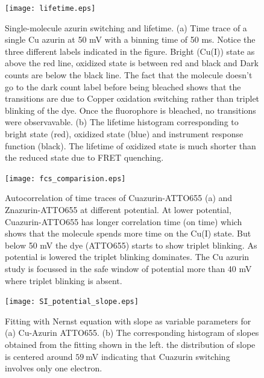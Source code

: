 \begin{figure}
  \centering
  \texttt{[image: lifetime.eps]}
  \makeatletter
  \renewcommand{\fnum@figure}{\figurename~S\thefigure
}  \makeatother
  \caption{Single-molecule azurin switching and lifetime. (a) Time trace of a single Cu azurin at 50 mV with a binning time of 50 ms. Notice the three different labels indicated in the figure. Bright (Cu(I)) state as above the red line, oxidized state is between red and black and Dark counts are below the black line. The fact that the molecule doesn't go to the dark count label before being bleached shows that the transitions are due to Copper oxidation switching rather than triplet blinking of the dye. Once the fluorophore is bleached, no transitions were observavable. (b) The lifetime histogram corresponding to bright state (red), oxidized state (blue) and instrument response function (black). The lifetime of oxidized state is much shorter than the reduced state due to FRET quenching.}
  \label{SIfig: lifetime}
\end{figure}
\begin{figure}
  \centering
  \texttt{[image: fcs\_comparision.eps]}
  \makeatletter
  \renewcommand{\fnum@figure}{\figurename~S\thefigure}
  \makeatother
  \caption{Autocorrelation of time traces of Cuazurin-ATTO655 (a) and Znazurin-ATTO655 at different potential. At lower potential, Cuazurin-ATTO655 has longer correlation time (on time) which shows that the molecule spends more time on the Cu(I) state. But below 50 mV the dye (ATTO655) starts to show triplet blinking. As potential is lowered the triplet blinking dominates. The Cu azurin study is focussed in the safe window of potential more than 40 mV where triplet blinking is absent.}
  \label{SIfig:fcscomparision}
\end{figure}
\begin{figure}
  \centering
  \texttt{[image: SI\_potential\_slope.eps]}
  \makeatletter
  \renewcommand{\fnum@figure}{\figurename~S\thefigure}
  \makeatother
  \caption{Fitting with Nernst equation with slope as variable parameters for  (a) Cu-Azurin ATTO655. (b) The corresponding histogram of slopes obtained from the fitting shown in the left. the distribution of slope is centered around $59~$mV indicating that Cuazurin switching  involves only one electron.}
  \label{SIfig:potential_slope}
\end{figure}
